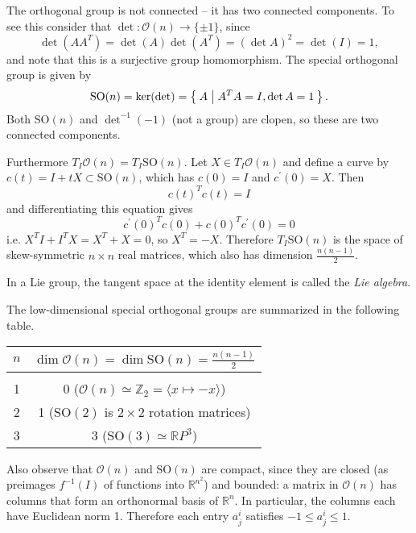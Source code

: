 \begin{xmpl}
\begin{enumerate}
{      The orthogonal group is not connected -- it has two connected
      components. To see this consider that
      $\det: \mathcal{O}(n) \to \{ \pm 1 \}$,
      since
      $$
        \det(A A^T)
      = \det (A) \det (A^T)
      = (\det A)^2
      = \det(I) = 1,
      $$
      and note that this is a surjective group homomorphism.
      The special orthogonal group is given by
      $$
        \mathrm{SO}(n)
      = \ker(\det)
      = \Set{A | A^TA = I, \det A = 1 }.
      $$
      Both
      $\mathrm{SO}(n)$ and $\det^{-1}(-1)$ (not a group) are clopen,
      so these are two connected components.

      Furthermore $T_I \mathcal{O}(n) = T_I \mathrm{SO}(n)$. Let
      $X \in T_I \mathcal{O}(n)$ and define a curve by
      $c(t) = I + tX \subset \mathrm{SO}(n)$, which has $c(0) = I$ and
      $c^\prime(0) = X$. Then
      $$
      c(t)^T c(t) = I
      $$
      and differentiating this equation gives
      $$
        c^\prime(0)^T
        c(0)
      + c(0)^T c^\prime(0)
      = 0
      $$
      i.e. $X^TI + I^T X = X^T + X = 0$, so $X^T = -X$. Therefore
      $T_I\mathrm{SO}(n)$ is the space of skew-symmetric $n \times n$
      real matrices, which also has dimension
      $\frac{n(n-1)}{2}$.
    }
  \end{enumerate}
\end{xmpl}

In a Lie group, the tangent space at the identity element is called
the \emph{Lie algebra}.

The low-dimensional special orthogonal groups are summarized in the
following table.

\begin{centering}
  \begin{tabular}{c | c}
    $n$ &
    $\dim \mathcal{O}(n) = \dim \mathrm{SO}(n) = \frac{n(n-1)}{2}$ \\
    \hline \\
    1 & 0 ($\mathcal{O}(n) \simeq \mathbb{Z}_2 = \langle x \mapsto -x \rangle$) \\
    2 & 1 ($\mathrm{SO}(2)$ is $2 \times 2$ rotation matrices) \\
    3 & 3 ($\mathrm{SO}(3) \simeq \mathbb{R}P^3$)
  \end{tabular}
\end{centering}

Also observe that $\mathcal{O}(n)$ and $\mathrm{SO}(n)$ are compact,
since they are closed (as preimages $f^{-1}(I)$ of functions into
$\mathbb{R}^{n^2}$) and bounded: a matrix in
$\mathcal{O}(n)$ has columns that form an orthonormal basis of
$\mathbb{R}^n$. In particular, the columns each have Euclidean norm 1.
Therefore each entry $a^i_j$ satisfies $-1 \leq a^i_j \leq 1$.

